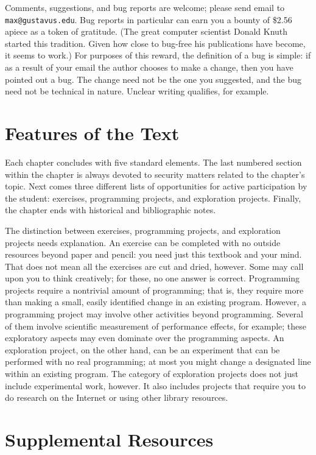 Comments, suggestions, and bug reports are welcome; please send email to
\verb|max@gustavus.edu|.  Bug reports in particular can earn you a
bounty of \$2.56 apiece as a token of gratitude. (The great computer
scientist Donald Knuth started this tradition.  Given how close to
bug-free his publications have become, it seems to work.)  For
purposes of this reward, the definition of a bug is simple: if as a
result of your email the author chooses to make a change, then you
have pointed out a bug.  The change need not be the one you suggested,
and the bug need not be technical in nature.  Unclear writing
qualifies, for example.

\section*{Features of the Text}

Each chapter concludes with five standard elements.  The last numbered
section within the chapter is always devoted to security matters
related to the chapter's topic.  Next comes three different lists of
opportunities for active participation by the student: exercises,
programming projects, and exploration projects.  Finally, the chapter
ends with historical and bibliographic notes.

The distinction between exercises, programming projects, and
exploration projects needs explanation.  An exercise can be completed
with no outside resources beyond paper and pencil: you need just this
textbook and your mind.  That does not mean all the exercises are cut
and dried, however.  Some may call upon you to think creatively; for
these, no one answer is correct.  Programming projects require a
nontrivial amount of programming; that is, they require more than
making a small, easily identified change in an existing
program. However, a programming project may involve other activities
beyond programming.  Several of them involve scientific measurement of
performance effects, for example; these exploratory aspects may even
dominate over the programming aspects.  An exploration project, on the
other hand, can be an experiment that can be performed with no real
programming; at most you might change a designated line within an
existing program.  The category of exploration projects does not just
include experimental work, however.  It also includes projects that
require you to do research on the Internet or using other library
resources.

\section*{Supplemental Resources}

